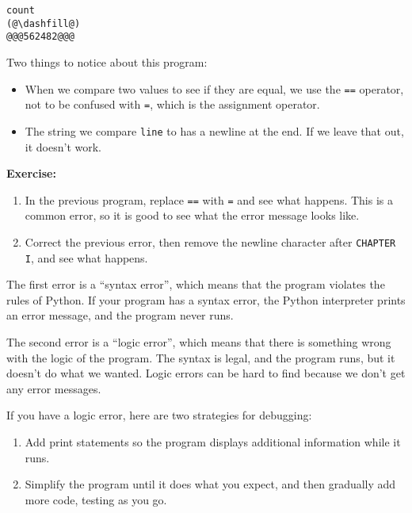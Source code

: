 \begin{lstlisting}[]
count
(@\dashfill@)
@@@562482@@@
\end{lstlisting}

Two things to notice about this program:

\begin{itemize}
\item
  When we compare two values to see if they are equal, we use the
  \passthrough{\lstinline!==!} operator, not to be confused with
  \passthrough{\lstinline!=!}, which is the assignment operator.
\item
  The string we compare \passthrough{\lstinline!line!} to has a newline
  at the end. If we leave that out, it doesn't work.
\end{itemize}

\textbf{Exercise:}

\begin{enumerate}
\def\labelenumi{\arabic{enumi}.}
\item
  In the previous program, replace \passthrough{\lstinline!==!} with
  \passthrough{\lstinline!=!} and see what happens. This is a common
  error, so it is good to see what the error message looks like.
\item
  Correct the previous error, then remove the newline character after
  \passthrough{\lstinline!CHAPTER I!}, and see what happens.
\end{enumerate}

The first error is a ``syntax error'', which means that the program
violates the rules of Python. If your program has a syntax error, the
Python interpreter prints an error message, and the program never runs.

The second error is a ``logic error'', which means that there is
something wrong with the logic of the program. The syntax is legal, and
the program runs, but it doesn't do what we wanted. Logic errors can be
hard to find because we don't get any error messages.

If you have a logic error, here are two strategies for debugging:

\begin{enumerate}
\def\labelenumi{\arabic{enumi}.}
\item
  Add print statements so the program displays additional information
  while it runs.
\item
  Simplify the program until it does what you expect, and then gradually
  add more code, testing as you go.
\end{enumerate}

